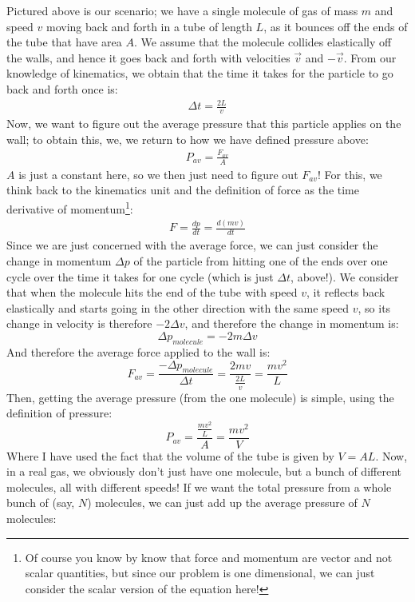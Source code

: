 Pictured above is our scenario; we have a single molecule of gas of mass $m$ and speed $v$ moving back and forth in a tube of length $L$, as it bounces off the ends of the tube that have area $A$. We assume that the molecule collides elastically off the walls, and hence it goes back and forth with velocities $\vec{v}$ and $-\vec{v}$. From our knowledge of kinematics, we obtain that the time it takes for the particle to go back and forth once is:
\begin{align*}
    \Delta t = \frac{2L}{v}
\end{align*}
Now, we want to figure out the average pressure that this particle applies on the wall; to obtain this, we, we return to how we have defined pressure above:
\begin{align*}
    P_{av} = \frac{F_{av}}{A}
\end{align*}
$A$ is just a constant here, so we then just need to figure out $F_{av}$! For this, we think back to the kinematics unit and the definition of force as the time derivative of momentum\footnote{Of course you know by know that force and momentum are vector and not scalar quantities, but since our problem is one dimensional, we can just consider the scalar version of the equation here!}:
\begin{align*}
    F = \frac{dp}{dt} = \frac{d(mv)}{dt}
\end{align*}
Since we are just concerned with the average force, we can just consider the change in momentum $\Delta p$ of the particle from hitting one of the ends over one cycle over the time it takes for one cycle (which is just $\Delta t$, above!). We consider that when the molecule hits the end of the tube with speed $v$, it reflects back elastically and starts going in the other direction with the same speed $v$, so its change in velocity is therefore $-2\Delta v$, and therefore the change in momentum is:
\[ \Delta p_{molecule} = -2m\Delta v\]
And therefore the average force applied to the wall is:
\[ F_{av} = \frac{-\Delta p_{molecule}}{\Delta t} = \frac{2mv}{\frac{2L}{v}} = \frac{mv^2}{L} \]
Then, getting the average pressure (from the one molecule) is simple, using the definition of pressure:
\[P_{av} = \frac{\frac{mv^2}{L}}{A} = \frac{mv^2}{V} \]
Where I have used the fact that the volume of the tube is given by $V = AL$. Now, in a real gas, we obviously don't just have one molecule, but a bunch of different molecules, all with different speeds! If we want the total pressure from a whole bunch of (say, $N$) molecules, we can just add up the average pressure of $N$ molecules:
